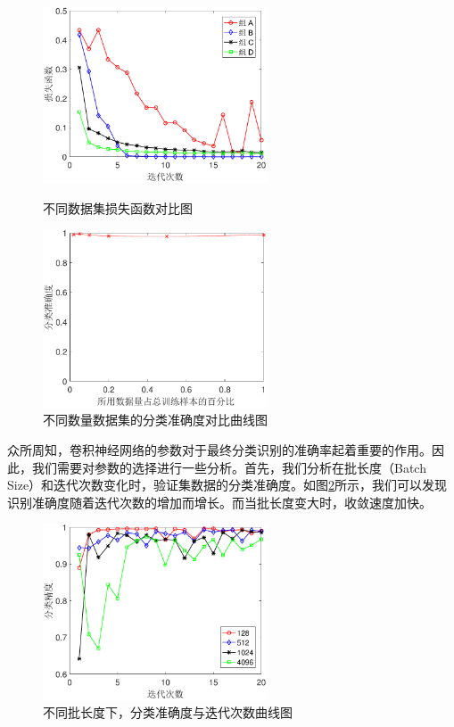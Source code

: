 \begin{figure}[hbt]
	\centering
	\begin{minipage}{7cm}
		\includegraphics[width=6.67cm]{figures/othr/group_results}
		\caption{不同数据集损失函数对比图}
		\label{fig:group_results}
	\end{minipage}
	\hspace{10pt}
	\begin{minipage}{7cm}
		\includegraphics[width=6.67cm]{figures/othr/sizes}
		\caption{不同数量数据集的分类准确度对比曲线图}
		\label{fig:sizes}

	\end{minipage}

\end{figure}


众所周知，卷积神经网络的参数对于最终分类识别的准确率起着重要的作用。因此，我们需要对参数的选择进行一些分析。首先，我们分析在批长度（Batch Size）和迭代次数变化时，验证集数据的分类准确度。如图\ref{fig:epoch}所示，我们可以发现识别准确度随着迭代次数的增加而增长。而当批长度变大时，收敛速度加快。
\begin{figure}[H]
	\centering
	\includegraphics[width=6.67cm]{figures/othr/epoch}
	\caption{不同批长度下，分类准确度与迭代次数曲线图}
	\label{fig:epoch}
\end{figure}

